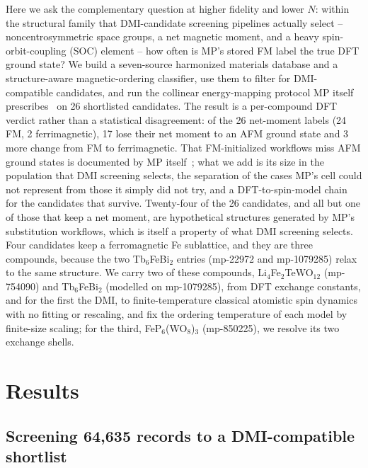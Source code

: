 \documentclass[aps,prb,preprint,superscriptaddress,longbibliography,nofootinbib]{revtex4-2}
\begin{document}
Here we ask the complementary question at higher fidelity and lower $N$: within the structural family that
DMI-candidate screening pipelines actually select -- noncentrosymmetric space groups, a net magnetic moment,
and a heavy spin-orbit-coupling (SOC) element -- how often is MP's stored FM label the true DFT ground state?
We build a seven-source harmonized materials database and a structure-aware magnetic-ordering classifier, use
them to filter for DMI-compatible candidates, and run the collinear energy-mapping protocol MP itself
prescribes~\cite{horton2019} on 26 shortlisted candidates. The result is a per-compound DFT verdict rather
than a statistical disagreement: of the 26 net-moment labels (24 FM, 2 ferrimagnetic), 17 lose their net
moment to an AFM ground state and 3 more change from FM to ferrimagnetic. That FM-initialized workflows miss AFM
ground states is documented by MP itself~\cite{horton2019}; what we add is its size in the population that DMI
screening selects, the separation of the cases MP's cell could not represent from those it simply did not
try, and a DFT-to-spin-model chain for the candidates that survive. Twenty-four of the 26 candidates, and
all but one of those that keep a net moment, are hypothetical structures generated by MP's substitution workflows, which
is itself a property of what DMI screening selects. Four candidates keep a ferromagnetic Fe sublattice, and they are three compounds, because the two
Tb$_6$FeBi$_2$ entries (mp-22972 and mp-1079285) relax to the same structure. We carry two of these compounds,
Li$_4$Fe$_2$TeWO$_{12}$ (mp-754090) and Tb$_6$FeBi$_2$ (modelled on mp-1079285), from DFT exchange constants,
and for the first the DMI, to finite-temperature classical atomistic spin dynamics with no fitting or
rescaling, and fix the ordering temperature of each model by finite-size scaling; for the third,
FeP$_6$(WO$_8$)$_3$ (mp-850225), we resolve its two exchange shells.

\section*{Results}

\subsection*{Screening 64,635 records to a DMI-compatible shortlist}
\end{document}
